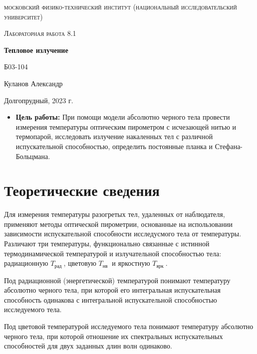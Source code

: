 \documentclass[a4paper, 12pt]{article}
\begin{document}
\begin{titlepage}
	\centering
	\vspace{5cm}
	{\scshape\LARGE московский физико-технический институт (национальный исследовательский университет) \par}
	\vspace{6cm}
	{\scshape\Large Лабораторная работа 8.1 \par}
	{\huge\bfseries Тепловое излучение \par}
	\vspace{1cm}
	\vfill
\begin{flushright}
	{\large Б03-104}\par
	\vspace{0.3cm}
	{\LARGE Куланов Александр}
\end{flushright}
	

	\vfill


	Долгопрудный, 2023 г.
\end{titlepage}

\begin{itemize}
	\item \textbf{Цель работы:} При помощи модели абсолютно черного тела провести измерения температуры оптическим пирометром с исчезающей
	нитью и термопарой, исследовать излучение накаленных тел с различной испускательной способностью, определить постоянные планка и Стефана-Больцмана.
\end{itemize}

\section{Теоретические сведения}
Для измерения температуры разогретых тел, удаленных от наблюдателя, применяют методы оптической пирометрии, основанные на использовании зависимости испускательной способности исследусмого тела от температуры. Различают три температуры, функционально связанные с истинной термодинамической температурой и излучательной способностью тела: радиационную $T_{\text {рад }}$, цветовую $T_{\text {нв }}$ и яркостную $T_{\text {ярк }}$.

Под радиационной (энергетической) температурой понимают температуру абсолютно черного тела, при которой его интегральная испускательная способность одинакова с интегральной испускательной способностью исследуемого тела.

Под цветовой температурой исследуемого тела понимают температуру абсолютно черного тела, при которой отношение их спектральных испускательных способностей для двух заданных длин волн одинаково.
\end{document}
